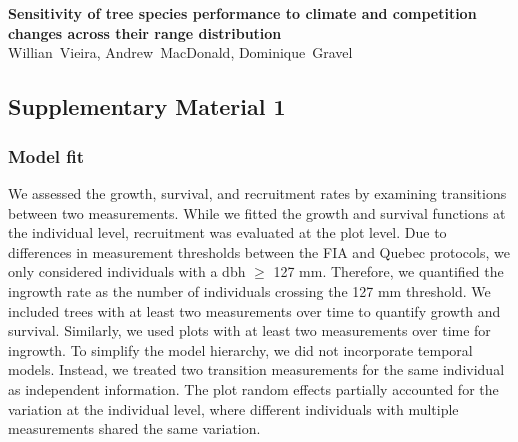 \graphicspath{{chapter2/}{manuscript/}}

\chapter{\textbf{}}

\begin{center}
\textbf{Sensitivity of tree species performance to climate and
competition changes across their range distribution} \\
Willian~Vieira, Andrew~MacDonald, Dominique~Gravel
\end{center}

\hypertarget{supplementary-material-1}{%
\section{Supplementary Material 1}\label{supplementary-material-1}}

\hypertarget{sec-model-fit}{%
\subsection{Model fit}\label{sec-model-fit}}

We assessed the growth, survival, and recruitment rates by examining
transitions between two measurements. While we fitted the growth and
survival functions at the individual level, recruitment was evaluated at
the plot level. Due to differences in measurement thresholds between the
FIA and Quebec protocols, we only considered individuals with a dbh
\(\ge\) 127 mm. Therefore, we quantified the ingrowth rate as the number
of individuals crossing the 127 mm threshold. We included trees with at
least two measurements over time to quantify growth and survival.
Similarly, we used plots with at least two measurements over time for
ingrowth. To simplify the model hierarchy, we did not incorporate
temporal models. Instead, we treated two transition measurements for the
same individual as independent information. The plot random effects
partially accounted for the variation at the individual level, where
different individuals with multiple measurements shared the same
variation.\\

